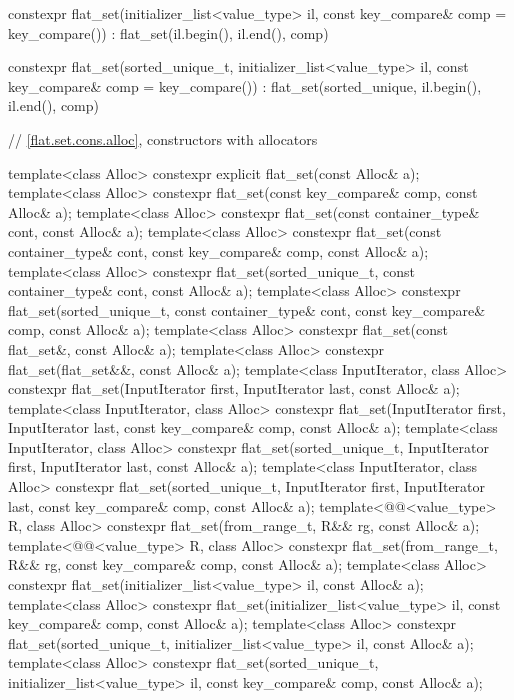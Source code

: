 \begin{codeblock}
{{    constexpr flat_set(initializer_list<value_type> il, const key_compare& comp = key_compare())
        : flat_set(il.begin(), il.end(), comp) { }

    constexpr flat_set(sorted_unique_t, initializer_list<value_type> il,
             const key_compare& comp = key_compare())
        : flat_set(sorted_unique, il.begin(), il.end(), comp) { }

    // \ref{flat.set.cons.alloc}, constructors with allocators

    template<class Alloc>
      constexpr explicit flat_set(const Alloc& a);
    template<class Alloc>
      constexpr flat_set(const key_compare& comp, const Alloc& a);
    template<class Alloc>
      constexpr flat_set(const container_type& cont, const Alloc& a);
    template<class Alloc>
      constexpr flat_set(const container_type& cont, const key_compare& comp, const Alloc& a);
    template<class Alloc>
      constexpr flat_set(sorted_unique_t, const container_type& cont, const Alloc& a);
    template<class Alloc>
      constexpr flat_set(sorted_unique_t, const container_type& cont,
                         const key_compare& comp, const Alloc& a);
    template<class Alloc>
      constexpr flat_set(const flat_set&, const Alloc& a);
    template<class Alloc>
      constexpr flat_set(flat_set&&, const Alloc& a);
    template<class InputIterator, class Alloc>
      constexpr flat_set(InputIterator first, InputIterator last, const Alloc& a);
    template<class InputIterator, class Alloc>
      constexpr flat_set(InputIterator first, InputIterator last,
                         const key_compare& comp, const Alloc& a);
    template<class InputIterator, class Alloc>
      constexpr flat_set(sorted_unique_t, InputIterator first, InputIterator last,
                         const Alloc& a);
    template<class InputIterator, class Alloc>
      constexpr flat_set(sorted_unique_t, InputIterator first, InputIterator last,
                         const key_compare& comp, const Alloc& a);
    template<@@<value_type> R, class Alloc>
      constexpr flat_set(from_range_t, R&& rg, const Alloc& a);
    template<@@<value_type> R, class Alloc>
      constexpr flat_set(from_range_t, R&& rg, const key_compare& comp, const Alloc& a);
    template<class Alloc>
      constexpr flat_set(initializer_list<value_type> il, const Alloc& a);
    template<class Alloc>
      constexpr flat_set(initializer_list<value_type> il, const key_compare& comp,
                         const Alloc& a);
    template<class Alloc>
      constexpr flat_set(sorted_unique_t, initializer_list<value_type> il, const Alloc& a);
    template<class Alloc>
      constexpr flat_set(sorted_unique_t, initializer_list<value_type> il,
                         const key_compare& comp, const Alloc& a);

}}
\end{codeblock}
